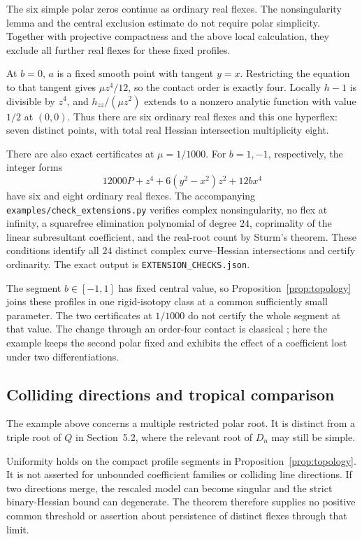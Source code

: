 \documentclass[11pt,a4paper]{article}
\theoremstyle{remark}
\begin{document}
The six simple polar zeros continue as ordinary real flexes.
The nonsingularity lemma and the central exclusion estimate
do not require polar simplicity. Together with projective
compactness and the above local calculation, they exclude
all further real flexes for these fixed profiles.

At \(b=0\), \(a\) is a fixed smooth point with tangent
\(y=x\). Restricting the equation to that tangent gives
\(\mu z^4/12\), so the contact order is exactly four.
Locally \(h-1\) is divisible by \(z^4\), and
\(h_{zz}/(\mu z^2)\) extends to a nonzero analytic
function with value \(1/2\) at \((0,0)\).
Thus there are six ordinary real flexes and this one
hyperflex: seven distinct points, with total real Hessian
intersection multiplicity eight.

There are also exact certificates at \(\mu=1/1000\).
For \(b=1,-1\), respectively, the integer forms
\[
 12000P+z^4+6(y^2-x^2)z^2+12bx^4
\]
have six and eight ordinary real flexes. The accompanying
\texttt{examples/check\_extensions.py} verifies complex
nonsingularity, no flex at infinity, a squarefree elimination
polynomial of degree \(24\), coprimality of the linear
subresultant coefficient, and the real-root count by Sturm's
theorem. These conditions identify all \(24\) distinct
complex curve--Hessian intersections and certify ordinarity.
The exact output is \texttt{EXTENSION\_CHECKS.json}.

The segment \(b\in[-1,1]\) has fixed central value, so
Proposition~\ref{prop:topology} joins these profiles in one
rigid-isotopy class at a common sufficiently small parameter.
The two certificates at \(1/1000\) do not certify the whole
segment at that value. The change through an order-four
contact is classical \citep[Section~3.1]{arroyoetal}; here
the example keeps the second polar fixed and exhibits the
effect of a coefficient lost under two differentiations.

\subsection{Colliding directions and tropical comparison}

The example above concerns a multiple restricted polar root.
It is distinct from a triple root of \(Q\) in Section~5.2,
where the relevant root of \(D_n\) may still be simple.

Uniformity holds on the compact profile segments in
Proposition~\ref{prop:topology}. It is not asserted for
unbounded coefficient families or colliding line directions.
If two directions merge, the rescaled model can become singular
and the strict binary-Hessian bound can degenerate. The theorem
therefore supplies no positive common threshold or assertion
about persistence of distinct flexes through that limit.
\end{document}
